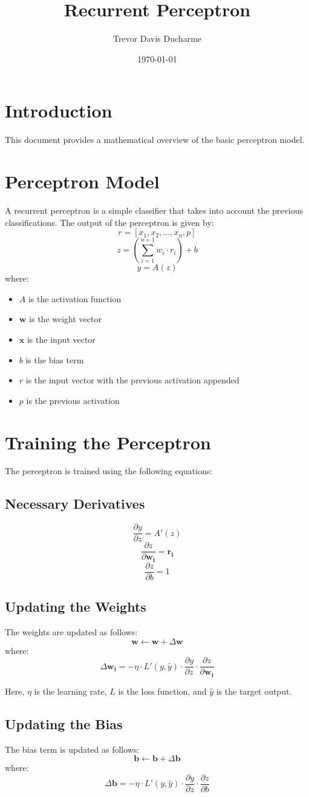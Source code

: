 \documentclass{article}
\title{Recurrent Perceptron}
\author{Trevor Davis Ducharme}
\date{\today}
\begin{document}
\maketitle

\section{Introduction}
This document provides a mathematical overview of the basic perceptron model.

\section{Perceptron Model}
A recurrent perceptron is a simple classifier that takes into account the previous classifications. The output of the perceptron is given by:
\[
	r = [x_1, x_2, \ldots, x_n, p]
\]
\[
	z = \left(\sum_{i=1}^{n+1} w_i \cdot r_i\right) + b
\]
\[
	y = A(z)
\]
where:
\begin{itemize}
	\item $A$ is the activation function
	\item $\mathbf{w}$ is the weight vector
	\item $\mathbf{x}$ is the input vector
	\item $b$ is the bias term
	\item $r$ is the input vector with the previous activation appended
	\item $p$ is the previous activation
\end{itemize}

\section{Training the Perceptron}
The perceptron is trained using the following equations:
\subsection{Necessary Derivatives}
\[
	\frac{\partial y}{\partial z} = A'(z)
\]
\[
	\frac{\partial z}{\partial \mathbf{w_i}} = \mathbf{r_i}
\]
\[
	\frac{\partial z}{\partial b} = 1
\]
\subsection{Updating the Weights}
The weights are updated as follows:
\[
\mathbf{w} \leftarrow \mathbf{w} + \Delta \mathbf{w}
\]
where:
\[
	\Delta \mathbf{w_i} = -\eta \cdot L'(y, \hat{y}) \cdot \frac{\partial y}{\partial z} \cdot \frac{\partial z}{\partial \mathbf{w_i}}
\]

Here, $\eta$ is the learning rate, $L$ is the loss function, and $\hat{y}$ is the target output.

\subsection{Updating the Bias}
The bias term is updated as follows:
\[
\mathbf{b} \leftarrow \mathbf{b} + \Delta \mathbf{b}
\]
where:
\[
	\Delta \mathbf{b} = -\eta \cdot L'(y, \hat{y}) \cdot \frac{\partial y}{\partial z} \cdot \frac{\partial z}{\partial b}
\]
\end{document}
